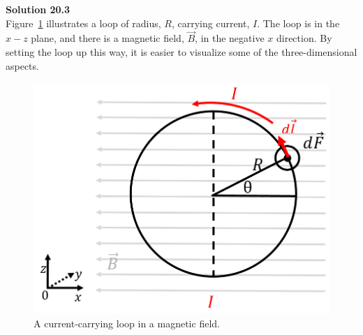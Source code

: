 \begin{framed}
\textbf{Solution 20.3}\\
Figure~\ref{fig:magneticforce:proof1} illustrates a loop of radius, $R$, carrying current, $I$. The loop is in the $x -z$ plane, and there is a magnetic field, $\vec B$, in the negative $x$ direction. By setting the loop up this way, it is easier to visualize some of the three-dimensional aspects.

\begin{figure}[!htbp]
\centering
\includegraphics[width=0.5\linewidth]{files/proof1-8111f1e51bf6dd8310876d5f97bc88a5.png}
\caption[]{A current-carrying loop in a magnetic field.}
\label{fig:magneticforce:proof1}
\end{figure}


\end{framed}
